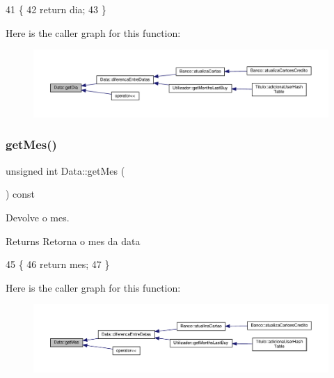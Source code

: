 \begin{DoxyCode}
41                                 \{
42     \textcolor{keywordflow}{return} dia;
43 \}
\end{DoxyCode}
Here is the caller graph for this function\+:
\nopagebreak
\begin{figure}[H]
\begin{center}
\leavevmode
\includegraphics[width=350pt]{classData_a459536c9351759b5697ba25456d9bd70_icgraph}
\end{center}
\end{figure}
\mbox{\label{classData_ab991d6a069c799930899b39bef9a4662}} 
\subsubsection{\texorpdfstring{get\+Mes()}{getMes()}}
{\footnotesize\ttfamily unsigned int Data\+::get\+Mes (\begin{DoxyParamCaption}{ }\end{DoxyParamCaption}) const}



Devolve o mes. 

\begin{DoxyReturn}{Returns}
Retorna o mes da data 
\end{DoxyReturn}

\begin{DoxyCode}
45                                 \{
46     \textcolor{keywordflow}{return} mes;
47 \}
\end{DoxyCode}
Here is the caller graph for this function\+:
\nopagebreak
\begin{figure}[H]
\begin{center}
\leavevmode
\includegraphics[width=350pt]{classData_ab991d6a069c799930899b39bef9a4662_icgraph}
\end{center}
\end{figure}
\mbox{\label{classData_a28b51c511a389cf30b9d1d2da858f3f6}} 
